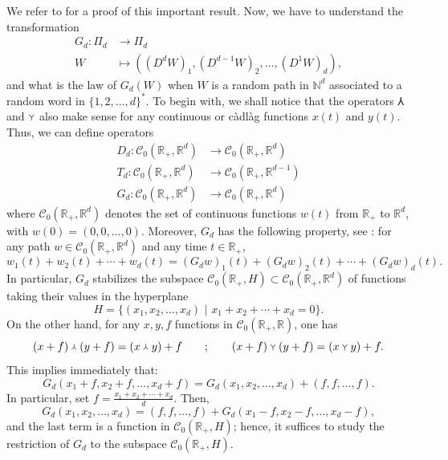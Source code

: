 \documentclass[smallextended,nospthms]{svjour3}
\theoremstyle{remark}
\newcommand{\N}{\mathbb{N}}
\newcommand{\R}{\mathbb{R}}
\begin{document}
We refer to \cite[Theorem 3.1]{OC03} for a proof of this important result. Now, we have to understand the transformation
\begin{align*}G_{d} : \Pi_{d} &\to \Pi_{d}\\
W &\mapsto \left((D^{d}W)_{1},(D^{d-1}W)_{2},\ldots,(D^{1}W)_{d}\right),
\end{align*}
and what is the law of $G_{d}(W)$ when $W$ is a random path in $\N^{d}$ associated to a random word in $\{1,2,\ldots,d\}^{*}$. To begin with, we shall notice that the operators $\Yup$ and $\Ydown$ also make sense for any continuous or c\`adl\`ag functions $x(t)$ and $y(t)$. Thus, we can define operators
\begin{align*}D_{d} : \mathscr{C}_{0}(\R_{+},\R^{d}) &\to \mathscr{C}_{0}(\R_{+},\R^{d})\\
T_{d} : \mathscr{C}_{0}(\R_{+},\R^{d}) &\to \mathscr{C}_{0}(\R_{+},\R^{d-1}) \\
 G_{d} : \mathscr{C}_{0}(\R_{+},\R^{d}) &\to \mathscr{C}_{0}(\R_{+},\R^{d})
 \end{align*}
where $\mathscr{C}_{0}(\R_{+},\R^{d})$ denotes the set of continuous functions $w(t)$ from $\R_{+}$ to $\R^{d}$, with $w(0)=(0,0,\ldots,0)$. Moreover, $G_{d}$ has the following property, see \cite[Lemma 2.2]{OC03}: for any path $w \in \mathscr{C}_{0}(\R_{+},\R^{d})$ and any time $t \in \R_{+}$,
$$w_{1}(t)+w_{2}(t)+\cdots+w_{d}(t)=(G_{d}w)_{1}(t)+(G_{d}w)_{2}(t)+\cdots+(G_{d}w)_{d}(t).$$
In particular, $G_{d}$ stabilizes the subspace $\mathscr{C}_{0}(\R_{+},H)\subset \mathscr{C}_{0}(\R_{+},\R^{d})$ of functions taking their values in the hyperplane
$$H=\{(x_{1},x_{2},\ldots,x_{d})\,\,|\,\,x_{1}+x_{2}+\cdots+x_{d}=0\}.$$
On the other hand, for any $x,y,f$ functions in $\mathscr{C}_{0}(\R_{+},\R)$, one has 
$$
(x+f) \Yup (y+f)=(x\Yup y)+f\qquad;\qquad(x+f)\Ydown (y+f)=(x\Ydown y)+f.
$$
This implies immediately that:
$$G_{d}(x_{1}+f,x_{2}+f,\ldots,x_{d}+f)=G_{d}(x_{1},x_{2},\ldots,x_{d})+(f,f,\ldots,f).$$
In particular, set $f=\frac{x_{1}+x_{2}+\cdots+x_{d}}{d}$. Then,
$$G_{d}(x_{1},x_{2},\ldots,x_{d})=(f,f,\ldots,f)+G_{d}(x_{1}-f,x_{2}-f,\ldots,x_{d}-f),$$
and the last term is a function in $\mathscr{C}_{0}(\R_{+},H)$; hence, it suffices to study the restriction of $G_{d}$ to the subspace $\mathscr{C}_{0}(\R_{+},H)$.\bigskip
\bigskip
\end{document}
